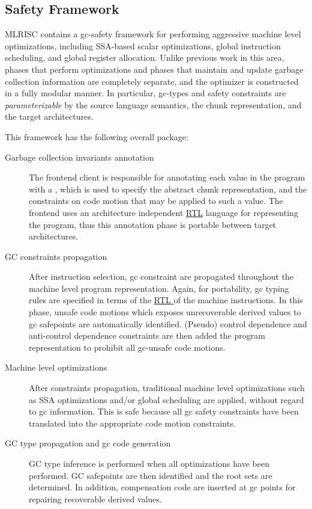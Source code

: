 \subsection{Safety Framework}
  MLRISC contains a gc-safety framework 
for performing aggressive machine level optimizations, including SSA-based
scalar optimizations, global instruction scheduling, and global
register allocation.  Unlike previous work in this area, phases that
perform optimizations and phases that maintain and update 
garbage collection information are completely separate, and the optimizer
is constructed in a fully modular manner.  In particular,
gc-types and safety constraints 
are \emph{parameterizable} 
by the source language semantics, the chunk representation, 
and the target architectures.  

This framework has the following overall package:
\begin{description}
\item[Garbage collection invariants annotation]
The frontend client is responsible for annotating each 
value in the program with a , which is 
used to specify the abstract chunk representation, 
and the constraints on code motion that may be applied to such a value.
The frontend uses an architecture independent \href{treecode.html}{RTL} 
language for representing the program, thus this annotation 
phase is portable between target architectures. 
\item[GC constraints propagation]
    After instruction selection, gc constraint are propagated throughout
the machine level program representation.  Again, for portability, gc typing
rules are specified in terms of the \href{treecode.html}{ RTL } of
the machine instructions.  In this phase, unsafe code motions which
exposes unrecoverable derived values to gc safepoints are automatically 
identified.   (Pseudo) control dependence and anti-control dependence 
constraints are then added the  program representation to prohibit all
gc-unsafe code motions.
\item[Machine level optimizations]
    After constraints propagation, traditional 
machine level optimizations such as
SSA optimizations and/or global scheduling are applied, without regard
to gc information.  This is safe because 
all gc safety constraints have been translated into the appropriate 
code motion constraints. 
\item[GC type propagation and gc code generation]
    GC type inference is performed when all optimizations
have been performed.  GC safepoints are then
identified and the root sets are determined.  In addition, compensation
code are inserted at gc points for repairing recoverable derived values.
\end{description}
